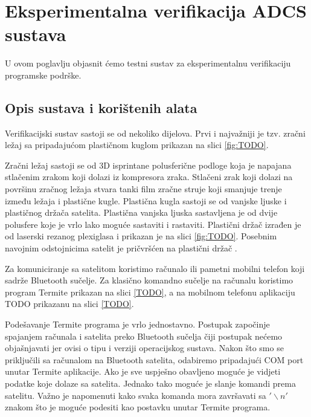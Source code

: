 \documentclass[times, utf8, diplomski, numeric]{templates/template}
\begin{document}
\chapter{Eksperimentalna verifikacija ADCS sustava}{
    U ovom poglavlju objasnit ćemo testni sustav za eksperimentalnu verifikaciju programske podrške. 

    \section{Opis sustava i korištenih alata}{
        Verifikacijski sustav sastoji se od nekoliko dijelova. Prvi i najvažniji je tzv. zračni ležaj sa pripadajućom plastičnom kuglom prikazan na slici \ref{fig:TODO}.


        Zračni ležaj sastoji se od 3D isprintane polusferične podloge koja je napajana stlačenim zrakom koji dolazi iz kompresora zraka. Stlačeni zrak koji dolazi na površinu zračnog ležaja stvara tanki film zračne struje koji smanjuje trenje između ležaja i plastične kugle. Plastična kugla sastoji se od vanjske ljuske i plastičnog držača satelita. Plastična vanjska ljuska sastavljena je od dvije polusfere koje je vrlo lako moguće sastaviti i rastaviti. Plastični držač izrađen je od laserski rezanog plexiglasa i prikazan je na slici \ref{fig:TODO}. Posebnim navojnim odstojnicima satelit je pričvršćen na plastični držač \cite{zracni_lezaj}.

        Za komuniciranje sa satelitom koristimo računalo ili pametni mobilni telefon koji sadrže Bluetooth sučelje. Za klasično komandno sučelje na računalu koristimo program Termite \cite{termite} prikazan na slici \ref{TODO}, a na mobilnom telefonu aplikaciju TODO \cite{TODO} prikazanu na slici \ref{TODO}.


        Podešavanje Termite programa je vrlo jednostavno. Postupak započinje spajanjem računala i satelita preko Bluetooth sučelja čiji postupak nećemo objašnjavati jer ovisi o tipu i verziji operacijskog sustava. Nakon što smo se priključili sa računalom na Bluetooth satelita, odabiremo pripadajući COM port unutar Termite aplikacije. Ako je sve uspješno obavljeno moguće je vidjeti podatke koje dolaze sa satelita. Jednako tako moguće je slanje komandi prema satelitu. Važno je napomenuti kako svaka komanda mora završavati sa $'\backslash n'$ znakom što je moguće podesiti kao postavku unutar Termite programa. 
        
}}
\end{document}
